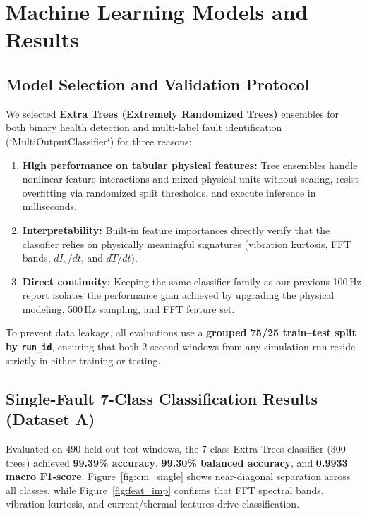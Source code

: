 \documentclass[11pt,a4paper]{article}
\begin{document}
\section{Machine Learning Models and Results}

\subsection{Model Selection and Validation Protocol}

We selected \textbf{Extra Trees (Extremely Randomized Trees)} ensembles for both binary health detection and multi-label fault identification (`MultiOutputClassifier`) for three reasons:
\begin{enumerate}[noitemsep]
    \item \textbf{High performance on tabular physical features:} Tree ensembles handle nonlinear feature interactions and mixed physical units without scaling, resist overfitting via randomized split thresholds, and execute inference in milliseconds.
    \item \textbf{Interpretability:} Built-in feature importances directly verify that the classifier relies on physically meaningful signatures (vibration kurtosis, FFT bands, $dI_a/dt$, and $dT/dt$).
    \item \textbf{Direct continuity:} Keeping the same classifier family as our previous 100\,Hz report isolates the performance gain achieved by upgrading the physical modeling, 500\,Hz sampling, and FFT feature set.
\end{enumerate}

To prevent data leakage, all evaluations use a \textbf{grouped 75/25 train--test split by \texttt{run\_id}}, ensuring that both 2-second windows from any simulation run reside strictly in either training or testing.

\subsection{Single-Fault 7-Class Classification Results (Dataset A)}

Evaluated on 490 held-out test windows, the 7-class Extra Trees classifier (300 trees) achieved \textbf{99.39\% accuracy}, \textbf{99.30\% balanced accuracy}, and \textbf{0.9933 macro F1-score}. Figure~\ref{fig:cm_single} shows near-diagonal separation across all classes, while Figure~\ref{fig:feat_imp} confirms that FFT spectral bands, vibration kurtosis, and current/thermal features drive classification.
\end{document}
